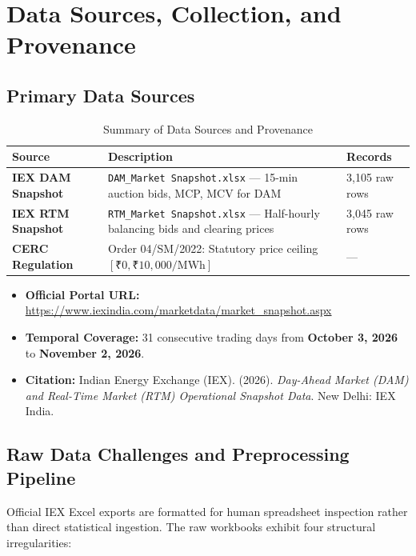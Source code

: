 \documentclass[12pt, a4paper]{article}
\theoremstyle{definition}
\newcommand{\MWh}{\text{MWh}}
\begin{document}
\section{Data Sources, Collection, and Provenance}

\subsection{Primary Data Sources}

\begin{table}[H]
\centering
\caption{Summary of Data Sources and Provenance}
\label{tab:data_sources}
\small
\begin{tabularx}{\textwidth}{>{\bfseries}l X l}
\toprule
\textbf{Source} & \textbf{Description} & \textbf{Records} \\
\midrule
IEX DAM Snapshot & \texttt{DAM\_Market Snapshot.xlsx} --- 15-min auction bids, MCP, MCV for DAM & 3,105 raw rows \\
IEX RTM Snapshot & \texttt{RTM\_Market Snapshot.xlsx} --- Half-hourly balancing bids and clearing prices & 3,045 raw rows \\
CERC Regulation & Order 04/SM/2022: Statutory price ceiling $[\text{₹}0, \text{₹}10{,}000/\MWh]$ & --- \\
\bottomrule
\end{tabularx}
\end{table}

\begin{itemize}
    \item \textbf{Official Portal URL:} \url{https://www.iexindia.com/marketdata/market_snapshot.aspx}
    \item \textbf{Temporal Coverage:} 31 consecutive trading days from \textbf{October 3, 2026} to \textbf{November 2, 2026}.
    \item \textbf{Citation:} Indian Energy Exchange (IEX). (2026). \textit{Day-Ahead Market (DAM) and Real-Time Market (RTM) Operational Snapshot Data}. New Delhi: IEX India.
\end{itemize}

\subsection{Raw Data Challenges and Preprocessing Pipeline}

Official IEX Excel exports are formatted for human spreadsheet inspection rather than direct statistical ingestion. The raw workbooks exhibit four structural irregularities:
\end{document}
